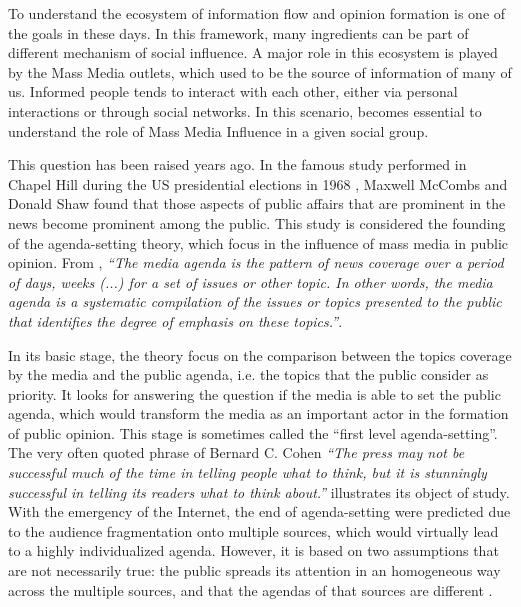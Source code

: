 \documentclass[a4paper, 12pt]{article}
\begin{document}
\par To understand the ecosystem of information flow and opinion formation is one of the goals in these days. In this framework, many ingredients can be part of different mechanism of social influence. A major role in this ecosystem is played by the Mass Media outlets, which used to be the source of information of many of us.  Informed people tends to interact with each other, either via personal interactions or through social networks. In this scenario, becomes essential to understand the role of Mass Media Influence in a given social group.
\par  This question has been raised years ago. In the famous study performed in Chapel Hill during the US presidential elections in 1968 \cite{mccombs1972agenda}, Maxwell McCombs and Donald Shaw found that those aspects of public affairs that are prominent in the news become prominent among the public.
This study is considered the founding of the agenda-setting theory, which focus in the influence of mass media in public opinion.  
From \cite{mccombs2014agenda}, \textit{``The media agenda is the pattern of news coverage over a period of days, weeks (...) for a set of issues or other topic. In other words, the media agenda is a systematic compilation of the issues or topics presented to the public that identifies the degree of emphasis on these topics.''}. 
\par In its basic stage, the theory focus on the comparison between the topics coverage by the media and the public agenda, i.e. the topics that the public consider as priority.
It looks for answering the question if the media is able to set the public agenda, which would transform the media as an important actor in the formation of public opinion. 
This stage is sometimes called the ``first level agenda-setting''.  The very often quoted phrase of Bernard C. Cohen \textit{``The press may not be successful much of the time in telling people what to think, but it is stunningly successful in telling its readers what to think about.''} illustrates its object of study. With the emergency of the Internet, the end of agenda-setting were predicted due to the audience fragmentation onto multiple sources, which would virtually lead to a highly individualized agenda. However, it is based on two assumptions that are not necessarily true: the public spreads its attention in an homogeneous way across the multiple sources, and that the agendas of that sources are different \cite{mccombs2005look}.
\end{document}
